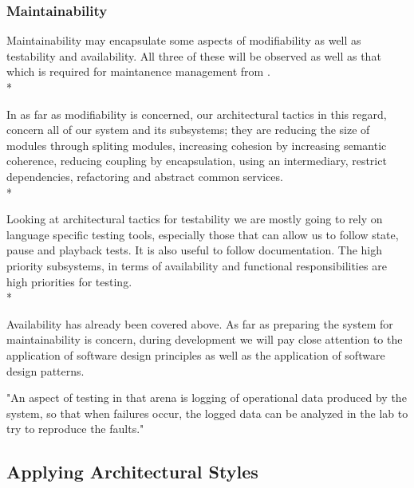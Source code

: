 \documentclass[11pt]{article}
\begin{document}

\subsubsection{Maintainability}

Maintainability may encapsulate some aspects of modifiability as well as testability and availability. All three of these will be observed as well as that which is required for maintanence management from \cite{Book:1}. \\*

In as far as modifiability is concerned, our architectural tactics in this regard, concern all of our system and its subsystems; they are reducing the size of modules through spliting modules, increasing cohesion by increasing semantic coherence, reducing coupling by encapsulation, using an intermediary, restrict dependencies, refactoring and abstract common services. \\*

Looking at architectural tactics for testability we are mostly going to rely on language specific testing tools, especially those that can allow us to follow state, pause and playback tests. It is also useful to follow documentation. The high priority subsystems, in terms of availability and functional responsibilities are high priorities for testing. \\*

Availability has already been covered above. As far as preparing the system for maintainability is concern, during development we will pay close attention to the application of software design principles as well as the application of software design patterns.

"An aspect of testing in that arena is logging of operational data produced by the system, so that when failures occur, the logged data can be analyzed in the lab to try to reproduce the faults."\cite{Book:2}

\subsection{Applying Architectural Styles}
\end{document}
